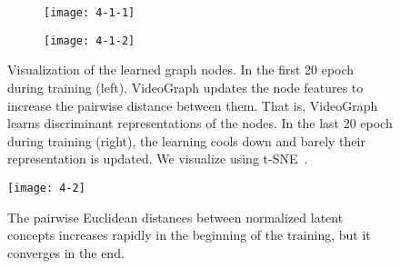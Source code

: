 \documentclass[10pt,twocolumn,letterpaper]{article}
\begin{document}
\begin{figure}
\begin{subfigure}[t]{0.22\textwidth}
\texttt{[image: 4-1-1]}
\caption{}
\vspace*{-2mm}
\label{fig:4-1-1}
\end{subfigure}\hfill
\begin{subfigure}[t]{0.22\textwidth}
\texttt{[image: 4-1-2]}
\caption{}
\vspace*{-2mm}
\label{fig:4-1-2}
\end{subfigure}
\caption{Visualization of the learned graph nodes.
In the first 20 epoch during training (left), VideoGraph updates the node features  to increase the pairwise distance between them.
That is, VideoGraph learns discriminant representations of the nodes.
In the last 20 epoch during training (right), the learning cools down and barely their representation is updated.
We visualize using t-SNE~\cite{maaten2008visualizing}.}
\vspace*{-5mm}
\label{fig:4-1}
\end{figure}

\begin{figure}[!ht]
\begin{center}
\texttt{[image: 4-2]}
\end{center}
\vspace*{-5mm}
\caption{
The pairwise Euclidean distances between normalized latent concepts  increases rapidly in the beginning of the training, but it converges in the end.}
\label{fig:4-4}
\vspace*{-5mm}
\end{figure}
\end{document}
